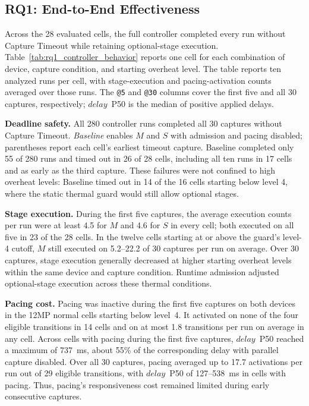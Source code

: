 \subsection{RQ1: End-to-End Effectiveness}
\label{sec:rq1}



Across the 28 evaluated cells, the full controller completed every run without Capture Timeout while retaining optional-stage execution.
Table~\ref{tab:rq1_controller_behavior} reports one cell for each combination of device, capture condition, and starting overheat level.
The table reports ten analyzed runs per cell, with stage-execution and pacing-activation counts averaged over those runs.
The \texttt{@5} and \texttt{@30} columns cover the first five and all 30 captures, respectively; \(\mathit{delay}\)~P50 is the median of positive applied delays.

\smallskip\noindent\textbf{Deadline safety.}
All 280 controller runs completed all 30 captures without Capture Timeout.
\emph{Baseline} enables \(M\) and \(S\) with admission and pacing disabled; parentheses report each cell's earliest timeout capture.
Baseline completed only 55 of 280 runs and timed out in 26 of 28 cells, including all ten runs in 17 cells and as early as the third capture.
These failures were not confined to high overheat levels: Baseline timed out in 14 of the 16 cells starting below level 4, where the static thermal guard would still allow optional stages.

\smallskip\noindent\textbf{Stage execution.}
During the first five captures, the average execution counts per run were at least 4.5 for \(M\) and 4.6 for \(S\) in every cell; both executed on all five in 23 of the 28 cells.
In the twelve cells starting at or above the guard's level-4 cutoff, \(M\) still executed on 5.2--22.2 of 30 captures per run on average.
Over 30 captures, stage execution generally decreased at higher starting overheat levels within the same device and capture condition.
Runtime admission adjusted optional-stage execution across these thermal conditions.

\smallskip\noindent\textbf{Pacing cost.}
Pacing was inactive during the first five captures on both devices in the 12MP normal cells starting below level~4.
It activated on none of the four eligible transitions in 14 cells and on at most 1.8 transitions per run on average in any cell.
Across cells with pacing during the first five captures, \(\mathit{delay}\)~P50 reached a maximum of 737~ms, about 55\% of the corresponding delay with parallel capture disabled.
Over all 30 captures, pacing averaged up to 17.7 activations per run out of 29 eligible transitions, with \(\mathit{delay}\)~P50 of 127--538~ms in cells with pacing.
Thus, pacing's responsiveness cost remained limited during early consecutive captures.
